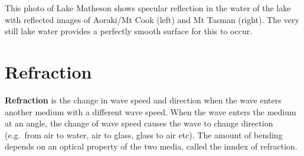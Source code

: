 %
%
%
%
\begin{figure}[ht]
  \centering
\end{figure}
This photo of Lake Matheson shows specular reflection in the water of the
lake with reflected images of Aoraki/Mt Cook (left) and Mt Tasman (right).
The very still lake water provides a perfectly smooth surface for this to
occur.



\section{Refraction}

\textbf{Refraction} is the change in wave speed and direction when the wave
enters another medium with a different wave speed. When the wave enters the
medium at an angle, the change of wave speed causes
the wave to  change direction (e.g.\ from air to water, air to glass, glass to
air etc). The amount of bending depends on an optical property of the
two media, called the inndex of refraction.

%  
%
%
%



